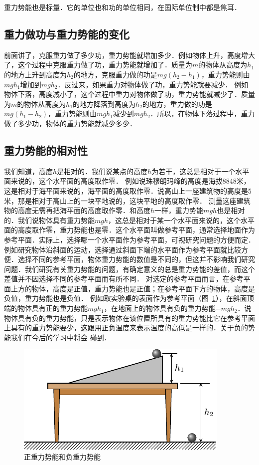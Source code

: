 重力势能也是标量．它的单位也和功的单位相同，在国际单位制中都是焦耳．

\subsection{重力做功与重力势能的变化}

前面讲了，克服重力做了多少功，重力势能就增加多少．例如物体上升，高度增大了，这个过程中克服重力做了功，重力势能就增加了．质量为$m$的物体从高度为$h_1$的地方上升到高度为$h_2$的地方，克服重力做的功是$mg(h_2-h_1)$，重力势能则由$mgh_1$增加到$mgh_2$．反过来，如果重力对物体做了功，重力势能就要减少．
例如物体下落，高度减小了，这个过程中重力对物体做了功，重力势能就减少了．质量为$m$的物体从高度为$h_1$的地方降落到高度为$h_2$的地方，重力做的功是$mg(h_1-h_2)$，重力势能则由$mgh_1$减少到$mgh_2$．所以，在物体下落过程中，重力做了多少功，物体的重力势能就减少多少．

\subsection{重力势能的相对性}

我们知道，高度$h$是相对的．我们说某点的高度$h$为若干，这总是相对于一个水平面来说的，这个水平面的高度取作零．
例如说珠穆朗玛峰的高度是海拔8848米，这是相对于海平面来说的，海平面的高度取作零．说高山上一座建筑物的高度是5米，那是相对于高山上的一块平地说的，这块平地的高度取作零．
测量这座建筑物的高度无需再把海平面的高度取作零．和高度$h$一样，重力势能$mgh$也是相对的．我们说物体具有重力势能$mgh$，这总是相对于某一个水平面来说的，这个水平面的高度取作零，重力势能也是零．这个水平面叫做参考平面，通常选择地面作为参考平面．实际上，选择哪一个水平面作为参考平面，可视研究问题的方便而定．例如研究物体沿斜面的运动，选择通过斜面下端的水平面作为参考平面就比较方便．选择不同的参考平面，物体重力势能的数值是不同的，但这并不影响我们研究问题．我们研究有关重力势能的问题，有确定意义的总是重力势能的差值，而这个差值并不因选择不同的参考平面而有所不同．
对选定的参考平面而言，在参考平面上方的物体，高度是正值，重力势能也是正值；在参考平面下方的物体，高度是负值，重力势能也是负值．
例如取实验桌的表面作为参考平面（图~\ref{fig_A_7-10}），在斜面顶端的物体具有正的重力势能$mgh_1$，在地面上的物体具有负的重力势能$-mgh_2$．说物体具有负的重力势能，只是表示物体在该位置所具有的重力势能比它在参考平面上具有的重力势能要少，这跟用正负温度来表示温度的高低是一样的．关于负的势能我们在今后的学习中将会
碰到．
\begin{figure}[htbp]
    \centering
    \includegraphics{fig/A/7-10.pdf}
    \caption{正重力势能和负重力势能}\label{fig_A_7-10}
\end{figure}

